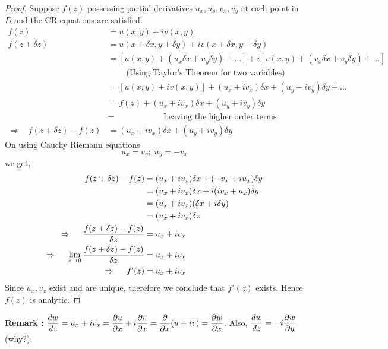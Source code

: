 \begin{proof}
Suppose $f(z)$ possessing partial derivatives $u_x,u_y,v_x,v_y$ at each point in $D$ and the CR equations are satisfied.
\begin{align*}
f(z) &= u(x,y)+iv(x,y)  \\
f(z+\delta z) &= u(x+\delta x,y+\delta y)+iv(x+\delta x,y+\delta y) \\
&= [u(x,y) + (u_x \delta x + u_y \delta y) + ... ] + i[v(x,y) + (v_x \delta x + v_y \delta y) + ... ] \\
&~~~~~~~~~~\text{(Using Taylor's Theorem for two variables)} \\
&= [u(x,y)+iv(x,y)] + (u_x+iv_x)\delta x  + (u_y+iv_y)\delta y + ... \\
&= f(z) +  (u_x+iv_x)\delta x  + (u_y+iv_y)\delta y \; \\
&=\;\;\;\;\;\;\;\;\;\;\;\;\;\;\;\;\;\;\;\;\text{ Leaving the higher order terms}\\
\Rightarrow ~~~~f(z+\delta z)-f(z) & = (u_x+iv_x)\delta x  + (u_y+iv_y)\delta y
\end{align*}
On using Cauchy Riemann equations 
\[u_x=v_y;\;u_y=-v_x \]
we get,
\begin{align*}
f(z+\delta z)-f(z) & = (u_x+iv_x)\delta x  + (-v_x+iu_x)\delta y \\
 & = (u_x+iv_x)\delta x  + i(iv_x+ u_x)\delta y \\
 & = (u_x+iv_x)(\delta x  + i\delta y) \\
 & = (u_x+iv_x)\delta z \\
\Rightarrow~~~~ \frac{f(z+\delta z)-f(z)}{\delta z} &= u_x + iv_x \\
\Rightarrow~~~~ \lim_{z \rightarrow 0}\frac{f(z+\delta z)-f(z)}{\delta z} &= u_x + iv_x \\
\Rightarrow~~~~ f'(z) &= u_x + iv_x
\end{align*}
Since $u_x, v_x$ exist and are unique, therefore we conclude that $f'(z)$ exists. Hence $f(z)$ is analytic.

\end{proof}
\textbf{Remark : }$\displaystyle \frac{dw}{dz} = u_x+iv_x = \frac{\partial u}{\partial x} + i \frac{\partial v}{\partial x} = \frac{\partial}{\partial x}(u+iv) = \frac{\partial w}{\partial x}$. Also, $\displaystyle \frac{dw}{dz} = -i \frac{\partial w}{\partial y}$(why?).

